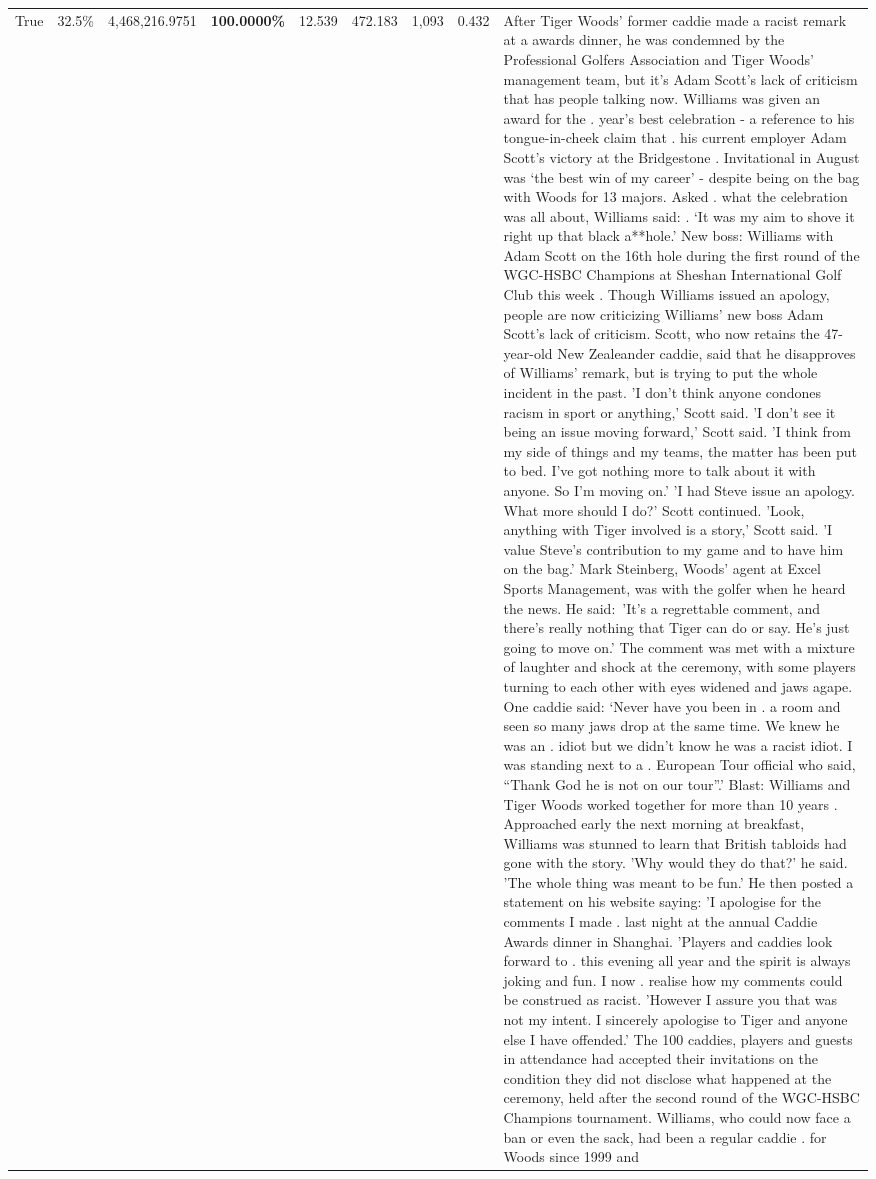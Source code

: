 \begin{table}[H]
\begin{tabular}{lllrlllll}
True & 32.5\% & 4,468,216.9751 & \bfseries \color{red} 100.0000\% & 12.539 & 472.183 & 1,093 & 0.432 & After Tiger Woods' former caddie made a racist remark at a awards dinner, he was condemned by the Professional Golfers Association and Tiger Woods' management team, but it's Adam Scott's lack of criticism that has people talking now. Williams was given an award for the . year’s best celebration - a reference to his tongue-in-cheek claim that . his current employer Adam Scott’s victory at the Bridgestone . Invitational in August was ‘the best win of my career’ - despite being on the bag with Woods for 13 majors. Asked . what the celebration was all about, Williams said: . ‘It was my aim to shove it right up that black a**hole.’ New boss: Williams with Adam Scott  on the 16th hole during the first round of the WGC-HSBC Champions at Sheshan International Golf Club this week . Though Williams issued an apology, people are now criticizing Williams' new boss Adam Scott's lack of criticism. Scott, who now retains the 47-year-old New Zealeander caddie, said that he disapproves of Williams' remark, but is trying to put the whole incident in the past. 'I don't think anyone condones racism in sport or anything,' Scott said. 'I don't see it being an issue moving forward,' Scott said. 'I think from my side of things and my teams, the matter has been put to bed. I've got nothing more to talk about it with anyone. So I'm moving on.' 'I had Steve issue an apology. What more should I do?' Scott continued. 'Look, anything with Tiger involved is a story,' Scott said. 'I value Steve's contribution to my game and to have him on the bag.' Mark Steinberg, Woods' agent at Excel Sports Management, was with the golfer when he heard the news. He said: 'It's a regrettable comment, and there's really nothing that Tiger can do or say. He's just going to move on.' The comment was met with a mixture of laughter and shock at the ceremony, with some players turning to each other with eyes widened and jaws agape. One caddie said: ‘Never have you been in . a room and seen so many jaws drop at the same time. We knew he was an . idiot but we didn’t know he was a racist idiot. I was standing next to a . European Tour official who said, “Thank God he is not on our tour”.’ Blast: Williams and Tiger Woods worked together for more than 10 years . Approached early the next morning at breakfast, Williams was stunned to learn that British tabloids had gone with the story. 'Why would they do that?' he said. 'The whole thing was meant to be fun.' He then posted a statement on his website saying: 'I apologise for the comments I made . last night at the annual Caddie Awards dinner in Shanghai. 'Players and caddies look forward to . this evening all year and the spirit is always joking and fun. I now . realise how my comments could be construed as racist. 'However I assure you that was not my intent. I sincerely apologise to Tiger and anyone else I have offended.' The 100 caddies, players and guests in attendance had accepted their invitations on the condition they did not disclose what happened at the ceremony, held after the second round of the WGC-HSBC Champions tournament. Williams, who could now face a ban or even the sack, had been a regular caddie . for Woods since 1999 and 
\end{tabular}
\end{table}
